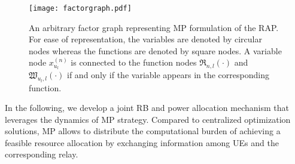 \documentclass[twocolumn,10pt]{IEEEtran}
\begin{document}
\begin{figure}[!t]
\centering
\texttt{[image: factorgraph.pdf]}
\caption{An arbitrary factor graph representing MP formulation of the RAP. For ease of representation, the variables are denoted by circular nodes whereas the functions are denoted by square nodes. A variable node $x_{u_l}^{(n)}$ is connected to the function nodes $\mathfrak{R}_{n,l}(\cdot)$ and $\mathfrak{W}_{u_l, l}(\cdot)$ if and only if the variable appears in the corresponding function.} 
\label{fig:factorgraph}
\end{figure}

In the following, we develop a joint RB and power allocation mechanism that leverages the dynamics of MP strategy. Compared to centralized optimization solutions, MP allows to distribute the computational burden of achieving a feasible resource allocation by exchanging information among UEs and the corresponding relay.
\end{document}
